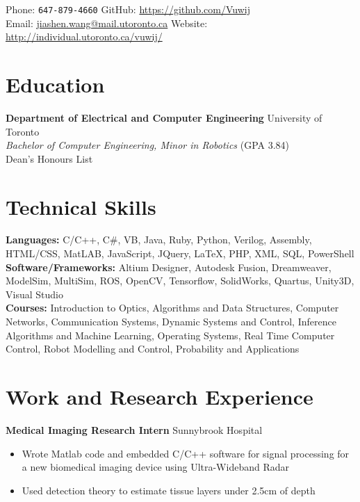 \documentclass[10pt, a4paper]{cv}
\begin{document}

Phone: \texttt{647-879-4660} \hfill
GitHub: \href{https://github.com/Vuwij}{https://github.com/Vuwij}\\
Email: \href{mailto:jiashen.wang@mail.utoronto.ca}{jiashen.wang@mail.utoronto.ca}\hfill
Website: \href{http://individual.utoronto.ca/vuwij/}{http://individual.utoronto.ca/vuwij/}

\section*{Education}
\textbf{Department of Electrical and Computer Engineering} \hfill University of Toronto\\
\emph{Bachelor of Computer Engineering, Minor in Robotics} \small{\textsc{(GPA 3.84)}}\\[0.1mm]
\small Dean's Honours List

\section*{Technical Skills}
\textbf{Languages:} C/C++, C\#, VB, Java, Ruby, Python, Verilog, Assembly, HTML/CSS, MatLAB, JavaScript, JQuery, LaTeX, PHP, XML, SQL, PowerShell\\[0.2em]
\textbf{Software/Frameworks:} Altium Designer, Autodesk Fusion, Dreamweaver, ModelSim, MultiSim, ROS, OpenCV, Tensorflow, SolidWorks, Quartus, Unity3D, Visual Studio\\[0.2em]
\textbf{Courses:} Introduction to Optics, Algorithms and Data Structures, Computer Networks, Communication Systems, Dynamic Systems and Control, Inference Algorithms and Machine Learning, Operating Systems, Real Time Computer Control, Robot Modelling and Control, Probability and Applications 

\section*{Work and Research Experience}\noindent

	\textbf{Medical Imaging Research Intern} \hfill Sunnybrook Hospital
	\begin{itemize}
		\item Wrote Matlab code and embedded C/C++ software for signal processing for a new biomedical imaging device using Ultra-Wideband Radar
		\item Used detection theory to estimate tissue layers under 2.5cm of depth
	\end{itemize}
	
\end{document}
